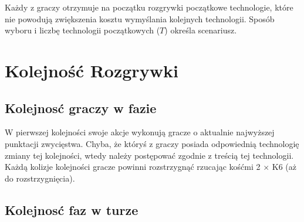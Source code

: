 \documentclass[11pt,a4paper]{article}
\begin{document}
Każdy z graczy otrzymuje na początku rozgrywki początkowe technologie, które nie powodują zwiększenia kosztu wymyślania kolejnych technologii. Sposób wyboru i liczbę technologii początkowych ($T$) określa scenariusz.

\section{Kolejność Rozgrywki}

\subsection{Kolejnosć graczy w fazie}

W pierwszej kolejności swoje akcje wykonują gracze o aktualnie najwyższej punktacji zwycięstwa. Chyba, że któryś z graczy posiada odpowiednią technologię zmiany tej kolejności, wtedy należy postępować zgodnie z treścią tej technologii. Każdą kolizje kolejności gracze powinni rozstrzygnąć rzucając kośćmi 2 $\times$ K6 (aż do rozstrzygnięcia).

\subsection{Kolejnosć faz w turze}
\end{document}
